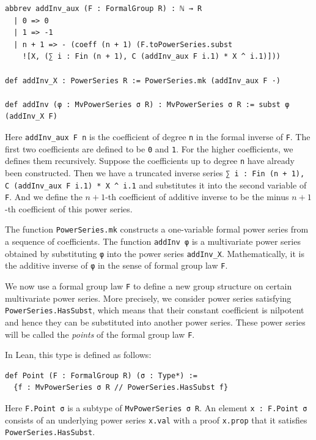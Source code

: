 \begin{lstlisting}
abbrev addInv_aux (F : FormalGroup R) : ℕ → R
  | 0 => 0
  | 1 => -1
  | n + 1 => - (coeff (n + 1) (F.toPowerSeries.subst
    ![X, (∑ i : Fin (n + 1), C (addInv_aux F i.1) * X ^ i.1)]))

def addInv_X : PowerSeries R := PowerSeries.mk (addInv_aux F ·)

def addInv (φ : MvPowerSeries σ R) : MvPowerSeries σ R := subst φ (addInv_X F)
\end{lstlisting}

Here \lstinline|addInv_aux F n| is the coefficient of degree \lstinline|n|
in the formal inverse of \lstinline|F|.  The first two coefficients are
defined to be \lstinline|0| and \lstinline|1|. For the higher coefficients,
we defines them recursively.  Suppose
the coefficients up to degree \lstinline|n| have already been constructed.
Then we have a truncated inverse series
\lstinline|∑ i : Fin (n + 1), C (addInv_aux F i.1) * X ^ i.1|
and substitutes it into the second variable of \lstinline|F|. And we define
the $n+1$-th coefficient of additive inverse to be the
minus $n+1$-th coefficient of this power series.

The function
\lstinline|PowerSeries.mk| constructs a one-variable formal
power series from a sequence of coefficients. The function
\lstinline|addInv φ| is a multivariate power series obtained by
substituting \lstinline|φ| into the power series \lstinline|addInv_X|.
Mathematically, it is the additive inverse of \lstinline|φ| in the sense
of formal group law \lstinline|F|.


We now use a formal group law \lstinline|F| to define a new group
structure on certain multivariate power series.  More precisely, we
consider power series satisfying \lstinline|PowerSeries.HasSubst|, which
means that their constant coefficient is nilpotent and hence they can be
substituted into another power series.  These power series will be called
the \emph{points} of the formal group law \lstinline|F|.

In Lean, this type is defined as follows:
\begin{lstlisting}
def Point (F : FormalGroup R) (σ : Type*) :=
  {f : MvPowerSeries σ R // PowerSeries.HasSubst f}
\end{lstlisting}

Here \lstinline|F.Point σ| is a subtype of \lstinline|MvPowerSeries σ R|.
An element \lstinline|x : F.Point σ|
consists of an underlying power series \lstinline|x.val| with a
proof \lstinline|x.prop| that it satisfies
\lstinline|PowerSeries.HasSubst|.

